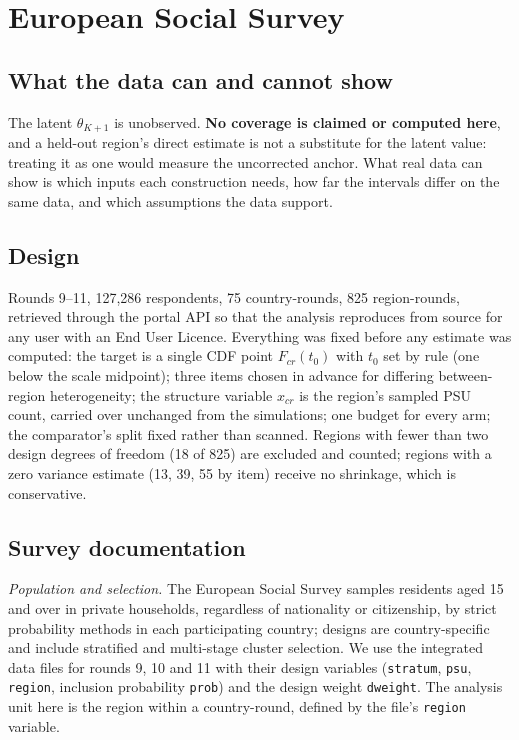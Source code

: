 \section{European Social Survey}\label{sec:ess}

\subsection{What the data can and cannot show}

The latent $\theta_{K+1}$ is unobserved. \textbf{No coverage is claimed or
computed here}, and a held-out region's direct estimate is not a substitute for
the latent value: treating it as one would measure the uncorrected anchor. What
real data can show is which inputs each construction needs, how far the intervals
differ on the same data, and which assumptions the data support.

\subsection{Design}

Rounds 9--11, 127{,}286 respondents, 75 country-rounds, 825 region-rounds,
retrieved through the portal API so that the analysis reproduces from source for
any user with an End User Licence. Everything was fixed before any estimate was
computed: the target is a single CDF point $F_{cr}(t_0)$ with $t_0$ set by rule
(one below the scale midpoint); three items chosen in advance for differing
between-region heterogeneity; the structure variable $x_{cr}$ is the region's
sampled PSU count, carried over unchanged from the simulations; one budget for
every arm; the comparator's split fixed rather than scanned. Regions with fewer
than two design degrees of freedom (18 of 825) are excluded and counted; regions
with a zero variance estimate (13, 39, 55 by item) receive no shrinkage, which is
conservative.

\subsection{Survey documentation}

\emph{Population and selection.} The European Social Survey samples residents
aged 15 and over in private households, regardless of nationality or citizenship,
by strict probability methods in each participating country; designs are
country-specific and include stratified and multi-stage cluster selection. We use
the integrated data files for rounds 9, 10 and 11 with their design variables
(\texttt{stratum}, \texttt{psu}, \texttt{region}, inclusion probability
\texttt{prob}) and the design weight \texttt{dweight}. The analysis unit here is
the region within a country-round, defined by the file's \texttt{region}
variable.

